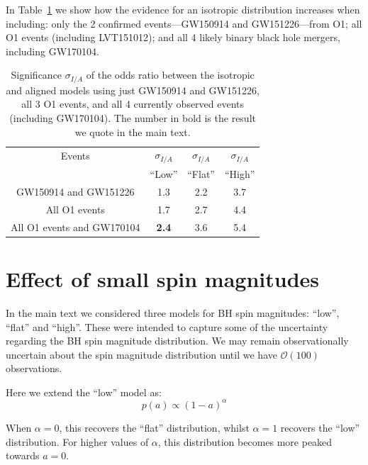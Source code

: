 \documentclass{nature}
\begin{document}
\begin{methods}
In Table~\ref{tab:accumulation} we show how the evidence for an isotropic distribution increases when including: only the 2 confirmed events---GW150914 and GW151226---from O1; all O1 events (including LVT151012); and all 4 likely binary black hole mergers, including GW170104. 

\begin{table}
\begin{centering}
\begin{tabular}{ c |  c  |  c  | c  }
  \hline 
  \hline
Events & $\sigma_{I/A}$ &  $\sigma_{I/A}$ & $\sigma_{I/A}$ \\ 
 & ``Low'' & ``Flat'' & ``High'' \\ \hline
GW150914 and GW151226 &  1.3 & 2.2 & 3.7 \\ %
All O1 events & 1.7 & 2.7 & 4.4 \\ %
All O1 events and GW170104 & \textbf{2.4} & 3.6 & 5.4 \\ \hline
\end{tabular}
\caption[]{Significance $\sigma_{I/A}$ of the odds ratio between the isotropic and aligned models using just GW150914 and GW151226, all 3 O1 events, and all 4 currently observed events (including GW170104). The number in bold is the result we quote in the main text.}
\label{tab:accumulation}
\end{centering}
\end{table}


\section{Effect of small spin magnitudes}
\label{sec:smallspins}

In the main text we considered three models for BH spin magnitudes:
``low'', ``flat'' and ``high''. These were intended to capture some of
the uncertainty regarding the BH spin magnitude distribution.  We may
remain observationally uncertain about the spin magnitude distribution
until we have $\mathcal{O}(100)$
observations\cite{2017arXiv170306869F,2017arXiv170306223G}.

Here we extend the ``low'' model as:
%
\begin{equation}
p(a) \propto (1 - a)^{\alpha}
\label{eq:lowspinalpha}
\end{equation}
%

When $\alpha = 0$, this recovers the ``flat'' distribution, whilst
$\alpha = 1$ recovers the ``low'' distribution. For higher values of
$\alpha$, this distribution becomes more peaked towards
$a = 0$.


\end{methods}
\end{document}
